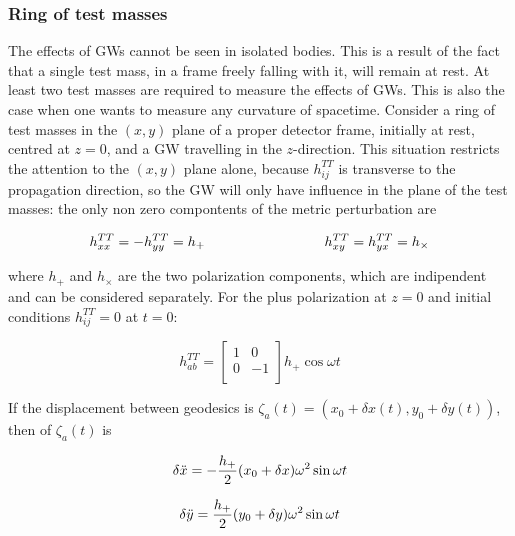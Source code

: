\documentclass[binding=0.6cm, LaM]{sapthesis}
\begin{document}
\subsubsection{Ring of test masses}
	The effects of GWs cannot be seen in isolated bodies. 
	This is a result of the fact that a single test mass, in a frame freely falling with it, 
	will remain at rest. At least two test masses are required to measure the effects of GWs. 
	This is also the case when one wants to measure any curvature of spacetime.
	Consider a ring of test masses in the $(x, y)$ plane of a proper detector frame, initially at rest, centred at $z = 0$, 
	and a GW travelling in the $z$-direction.
	This situation restricts the attention to the $(x,y)$ plane alone, because $h_{ij}^{TT}$ is transverse to the propagation direction, 
	so the GW will only have influence in the plane of the test masses:
	the only non zero compontents of the metric perturbation are

		\begin{equation}
		h_{xx}^{TT} = - h_{yy}^{TT} = h_{+} \hspace*{3cm} h_{xy}^{TT} = h_{yx}^{TT} = h_{\times}
		\end{equation}

	where $h_{+}$ and $h_{\times}$ are the two polarization components, which are indipendent and can be considered separately.
	For the plus polarization at $z=0$ and initial conditions $h_{ij}^{TT} = 0$ at $t=0$:

		\begin{equation}
		h_{ab}^{TT} = 
		\begin{bmatrix}
		1  & 0 \\
		0 &  -1 \\
		\end{bmatrix} 
		h_{+}\cos \omega t
		\end{equation}

	If the displacement between geodesics is $\zeta_a (t) = (x_0 + \delta x(t), y_0 + \delta y(t))$, then of $\zeta_a (t)$ is %

		\begin{equation}
		\delta {\ddot x} = - {{h_{+}} \over 2} (x_0 + \delta x) \omega ^2 \sin \omega t
		\end{equation}

		\begin{equation}
		\delta {\ddot y} =  {{h_{+}} \over 2} (y_0 + \delta y) \omega ^2 \sin \omega t
		\end{equation}
\end{document}
